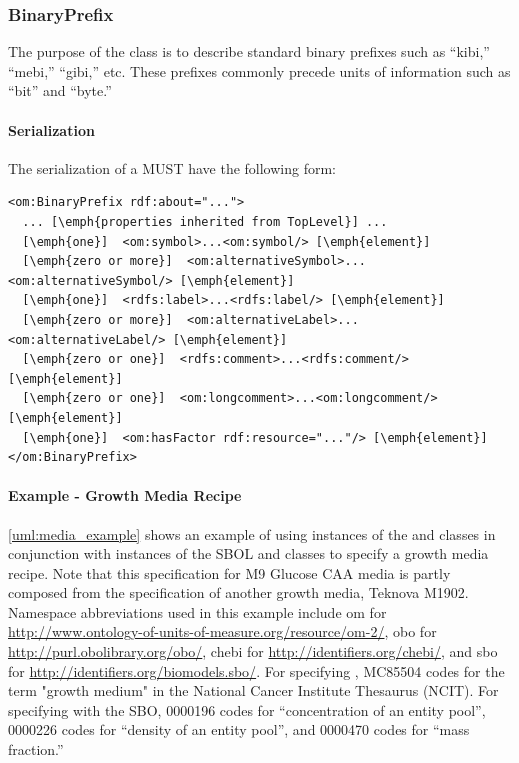 \subsubsection{BinaryPrefix}
\label{sec:BinaryPrefix}

The purpose of the  class is to describe standard binary prefixes such as ``kibi,'' ``mebi,'' ``gibi,'' etc. These prefixes commonly precede units of information such as ``bit'' and ``byte.''

\paragraph{Serialization}
The serialization of a  MUST have the following form:


\begin{lstlisting}
<om:BinaryPrefix rdf:about="...">
  ... [\emph{properties inherited from TopLevel}] ...
  [\emph{one}]  <om:symbol>...<om:symbol/> [\emph{element}]
  [\emph{zero or more}]  <om:alternativeSymbol>...<om:alternativeSymbol/> [\emph{element}]
  [\emph{one}]  <rdfs:label>...<rdfs:label/> [\emph{element}]
  [\emph{zero or more}]  <om:alternativeLabel>...<om:alternativeLabel/> [\emph{element}]
  [\emph{zero or one}]  <rdfs:comment>...<rdfs:comment/> [\emph{element}]
  [\emph{zero or one}]  <om:longcomment>...<om:longcomment/> [\emph{element}]
  [\emph{one}]  <om:hasFactor rdf:resource="..."/> [\emph{element}] 
</om:BinaryPrefix>
\end{lstlisting}

\paragraph{Example - Growth Media Recipe}

\ref{uml:media_example} shows an example of using instances of the  and  classes in conjunction with instances of the SBOL  and  classes to specify a growth media recipe. Note that this specification for M9 Glucose CAA media is partly composed from the specification of another growth media, Teknova M1902. Namespace abbreviations used in this example include om for \url{http://www.ontology-of-units-of-measure.org/resource/om-2/}, obo for \url{http://purl.obolibrary.org/obo/}, chebi for \url{http://identifiers.org/chebi/}, and sbo for \url{http://identifiers.org/biomodels.sbo/}. For specifying  , MC85504 codes for the term "growth medium" in the National Cancer Institute Thesaurus (NCIT). For specifying   with the SBO, 0000196 codes for ``concentration of an entity pool'', 0000226 codes for ``density of an entity pool'', and 0000470 codes for ``mass fraction.''


